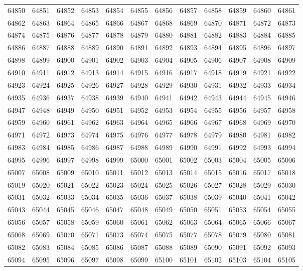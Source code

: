 \begin{center}
\begin{longtable}{llllllllllll}
64850 &64851 &64852 &64853 &64854 &64855 &64856 &64857 &64858 &64859 &64860 &64861 \\
64862 &64863 &64864 &64865 &64866 &64867 &64868 &64869 &64870 &64871 &64872 &64873 \\
64874 &64875 &64876 &64877 &64878 &64879 &64880 &64881 &64882 &64883 &64884 &64885 \\
64886 &64887 &64888 &64889 &64890 &64891 &64892 &64893 &64894 &64895 &64896 &64897 \\
64898 &64899 &64900 &64901 &64902 &64903 &64904 &64905 &64906 &64907 &64908 &64909 \\
64910 &64911 &64912 &64913 &64914 &64915 &64916 &64917 &64918 &64919 &64921 &64922 \\
64923 &64924 &64925 &64926 &64927 &64928 &64929 &64930 &64931 &64932 &64933 &64934 \\
64935 &64936 &64937 &64938 &64939 &64940 &64941 &64942 &64943 &64944 &64945 &64946 \\
64947 &64948 &64949 &64950 &64951 &64952 &64953 &64954 &64955 &64956 &64957 &64958 \\
64959 &64960 &64961 &64962 &64963 &64964 &64965 &64966 &64967 &64968 &64969 &64970 \\
64971 &64972 &64973 &64974 &64975 &64976 &64977 &64978 &64979 &64980 &64981 &64982 \\
64983 &64984 &64985 &64986 &64987 &64988 &64989 &64990 &64991 &64992 &64993 &64994 \\
64995 &64996 &64997 &64998 &64999 &65000 &65001 &65002 &65003 &65004 &65005 &65006 \\
65007 &65008 &65009 &65010 &65011 &65012 &65013 &65014 &65015 &65016 &65017 &65018 \\
65019 &65020 &65021 &65022 &65023 &65024 &65025 &65026 &65027 &65028 &65029 &65030 \\
65031 &65032 &65033 &65034 &65035 &65036 &65037 &65038 &65039 &65040 &65041 &65042 \\
65043 &65044 &65045 &65046 &65047 &65048 &65049 &65050 &65051 &65053 &65054 &65055 \\
65056 &65057 &65058 &65059 &65060 &65061 &65062 &65063 &65064 &65065 &65066 &65067 \\
65068 &65069 &65070 &65071 &65073 &65074 &65075 &65077 &65078 &65079 &65080 &65081 \\
65082 &65083 &65084 &65085 &65086 &65087 &65088 &65089 &65090 &65091 &65092 &65093 \\
65094 &65095 &65096 &65097 &65098 &65099 &65100 &65101 &65102 &65103 &65104 &65105 \\

\end{longtable}
\end{center}
